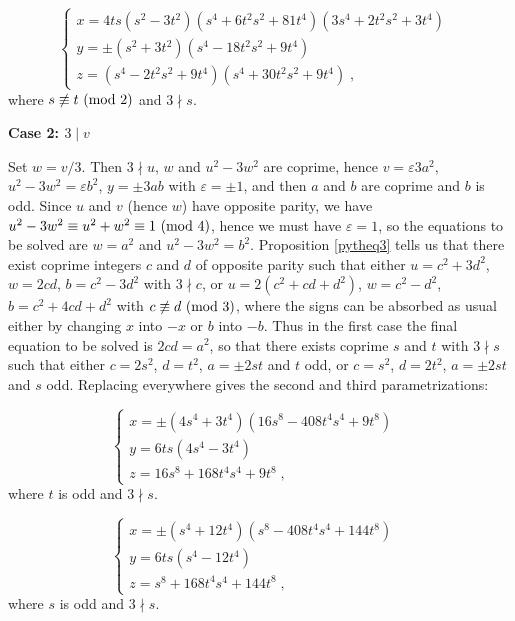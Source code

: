 \documentclass[12pt,a4paper]{article}
\newcommand{\eps}{\varepsilon}
\renewcommand{\pmod}[1]{\allowbreak\ ({\rm{mod}}\,\,#1)}
\begin{document}
$$\begin{cases}
x=4ts(s^2-3t^2)(s^4+6t^2s^2+81t^4)(3s^4+2t^2s^2+3t^4)&\\
y=\pm(s^2+3t^2)(s^4-18t^2s^2+9t^4)&\\
z=(s^4-2t^2s^2+9t^4)(s^4+30t^2s^2+9t^4)\;,&
\end{cases}$$
where $s\not\equiv t\pmod2$ and $3\nmid s$.

\smallskip

\noindent
{\bf Case 2: $3\mid v$}

\smallskip

Set $w=v/3$. Then $3\nmid u$, $w$ and $u^2-3w^2$ are coprime, hence 
$v=\eps 3a^2$, $u^2-3w^2=\eps b^2$, $y=\pm 3ab$ with $\eps=\pm1$,
and then $a$ and $b$ are coprime and $b$ is odd. Since $u$ and $v$ (hence $w$)
have opposite parity, we have $u^2-3w^2\equiv u^2+w^2\equiv1\pmod4$, hence
we must have $\eps=1$, so the equations to be solved are $w=a^2$ and
$u^2-3w^2=b^2$. Proposition \ref{pytheq3} tells us that there exist coprime 
integers $c$ and $d$ of opposite parity 
such that either $u=c^2+3d^2$, $w=2cd$, $b=c^2-3d^2$ with $3\nmid c$, or 
$u=2(c^2+cd+d^2)$, $w=c^2-d^2$, $b=c^2+4cd+d^2$ with $c\not\equiv d\pmod3$,
where the signs can be absorbed as usual either by changing $x$ into $-x$
or $b$ into $-b$. Thus in the first case the final equation to be solved is
$2cd=a^2$, so that there exists coprime $s$ and $t$ with $3\nmid s$ such that
either $c=2s^2$, $d=t^2$, $a=\pm2st$ and $t$ odd, or $c=s^2$, $d=2t^2$,
$a=\pm2st$ and $s$ odd. Replacing everywhere gives the second and third
parametrizations:

$$\begin{cases}
x=\pm(4s^4+3t^4)(16s^8-408t^4s^4+9t^8)&\\
y=6ts(4s^4-3t^4)&\\
z=16s^8+168t^4s^4+9t^8\;,&
\end{cases}$$
where $t$ is odd and $3\nmid s$.

$$\begin{cases}
x=\pm(s^4+12t^4)(s^8-408t^4s^4+144t^8)&\\
y=6ts(s^4-12t^4)&\\
z=s^8+168t^4s^4+144t^8\;,&
\end{cases}$$
where $s$ is odd and $3\nmid s$.
\end{document}
